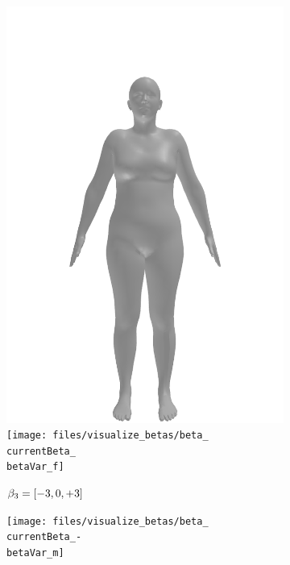 \begin{figure}[h!]
\begin{subfigure}{\betaWidth}
        \includegraphics[width=\imgWidth]{files/visualize_betas/baseline_f}
        \texttt{[image: files/visualize\_betas/beta\_\\currentBeta\_\\betaVar\_f]}
        \caption{$\beta_3 = [-3, 0, +3]$}
    \end{subfigure}
    \begin{subfigure}{\betaWidth}
        \def\currentBeta{3}
        \centering
        \texttt{[image: files/visualize\_betas/beta\_\\currentBeta\_-\\betaVar\_m]}

\end{subfigure}
\end{figure}
